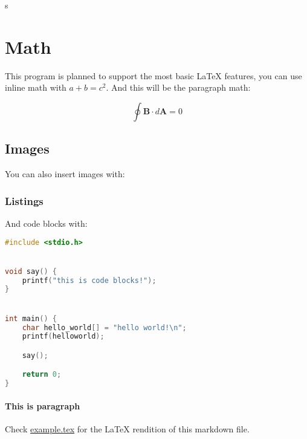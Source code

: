 \documentclass[12pt, a4paper]{article}
\begin{document}
s
    \section{Math}

    This program is planned to support the most basic LaTeX features, you can use inline math with $a + b = c^2$. And this will be the paragraph math:

    \begin{equation}
        \oint \boldsymbol{B} \cdot d \boldsymbol{A} = 0
    \end{equation}

    \subsection{Images}

    You can also insert images with:

    \subsubsection{Listings}

    And code blocks with:

\begin{lstlisting}[language=C]
#include <stdio.h>


void say() {
    printf("this is code blocks!");
}


int main() {
    char hello_world[] = "hello world!\n";
    printf(helloworld);

    say();

    return 0;
}
\end{lstlisting}

    \paragraph{This is paragraph}

    Check \href{./example.tex}{example.tex} for the LaTeX rendition of this markdown file.
\end{document}
